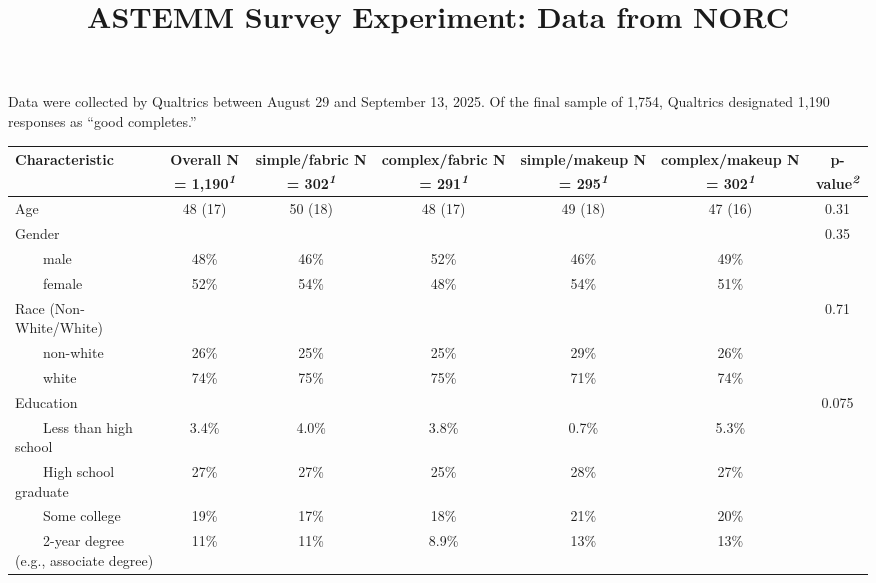 \documentclass[
]{article}
\title{ASTEMM Survey Experiment: Data from NORC}
\author{}
\date{}
\begin{document}
\maketitle
{}

\ifdefined\Shaded\renewenvironment{Shaded}{\begin{tcolorbox}[boxrule=0pt, sharp corners, interior hidden, frame hidden, enhanced, breakable, borderline west={3pt}{0pt}{shadecolor}]}{\end{tcolorbox}}\fi

Data were collected by Qualtrics between August 29 and September 13,
2025. Of the final sample of 1,754, Qualtrics designated 1,190 responses
as ``good completes.''

\begin{table}
\fontsize{12.0pt}{14.4pt}\selectfont
\begin{tabular*}{\linewidth}{@{\extracolsep{\fill}}lcccccc}
\toprule
\textbf{Characteristic} & \textbf{Overall}  N = 1,190\textsuperscript{\textit{1}} & \textbf{simple/fabric}  N = 302\textsuperscript{\textit{1}} & \textbf{complex/fabric}  N = 291\textsuperscript{\textit{1}} & \textbf{simple/makeup}  N = 295\textsuperscript{\textit{1}} & \textbf{complex/makeup}  N = 302\textsuperscript{\textit{1}} & \textbf{p-value}\textsuperscript{\textit{2}} \\ 
\midrule\addlinespace[2.5pt]
Age & 48 (17) & 50 (18) & 48 (17) & 49 (18) & 47 (16) & 0.31 \\ 
Gender &  &  &  &  &  & 0.35 \\ 
    male & 48\% & 46\% & 52\% & 46\% & 49\% &  \\ 
    female & 52\% & 54\% & 48\% & 54\% & 51\% &  \\ 
Race (Non-White/White) &  &  &  &  &  & 0.71 \\ 
    non-white & 26\% & 25\% & 25\% & 29\% & 26\% &  \\ 
    white & 74\% & 75\% & 75\% & 71\% & 74\% &  \\ 
Education &  &  &  &  &  & 0.075 \\ 
    Less than high school & 3.4\% & 4.0\% & 3.8\% & 0.7\% & 5.3\% &  \\ 
    High school graduate & 27\% & 27\% & 25\% & 28\% & 27\% &  \\ 
    Some college & 19\% & 17\% & 18\% & 21\% & 20\% &  \\ 
    2-year degree (e.g., associate degree) & 11\% & 11\% & 8.9\% & 13\% & 13\% &  \\ 

\end{tabular*}
\end{table}
\end{document}
